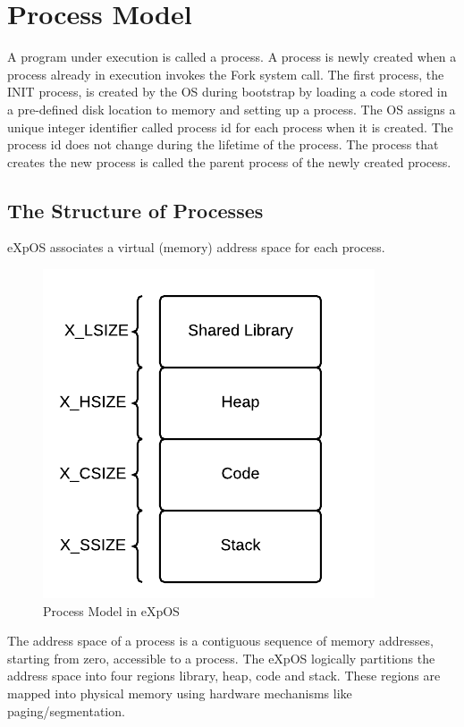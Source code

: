 \chapter{Process Model}
\label{chap4}
A program under execution is called a process. A process is newly created when a process already in execution invokes the Fork system call. The first process, the INIT process, is created by the OS during bootstrap by loading a code stored in a pre-defined disk location to memory and setting up a process. The OS assigns a unique integer identifier called process id for each process when it is created. The process id does not change during the lifetime of the process. The process that creates the new process is called the parent process of the newly created process.
\section{The Structure of Processes}

eXpOS associates a virtual (memory) address space for each process.

\begin{figure}[ht]
\centering
\includegraphics[scale=0.75]{figures/process_model.png}
\caption{\footnotesize Process Model in eXpOS}
\end{figure}

The address space of a process is a contiguous sequence of memory addresses, starting from zero, accessible to a process. The eXpOS logically partitions the address space into four regions library, heap, code and stack. These regions are mapped into physical memory using hardware mechanisms like paging/segmentation.


